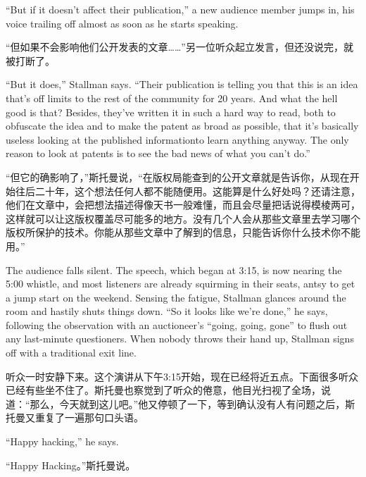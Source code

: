 \ifdefined\eng
``But if it doesn't affect their publication,'' a new audience member jumps in, his voice trailing off almost as soon as he starts speaking.
\fi

\ifdefined\chs
``但如果不会影响他们公开发表的文章……''另一位听众起立发言，但还没说完，就被打断了。
\fi

\ifdefined\eng
``But it does,'' Stallman says. ``Their publication is telling you that this is an idea that's off limits to the rest of the community for 20 years. And what the hell good is that? Besides, they've written it in such a hard way to read, both to obfuscate the idea and to make the patent as broad as possible, that it's basically useless looking at the published information\ifdefined{}\fi to learn anything anyway. The only reason to look at patents is to see the bad news of what you can't do.''
\fi

\ifdefined\chs
``但它的确影响了，''斯托曼说，``在版权局能查到的公开文章就是告诉你，从现在开始往后二十年，这个想法任何人都不能随便用。这能算是什么好处吗？还请注意，他们在文章中，会把想法描述得像天书一般难懂，而且会尽量把话说得模棱两可，这样就可以让这版权覆盖尽可能多的地方。没有几个人会从那些文章里去学习哪个版权所保护的技术。你能从那些文章中了解到的信息，只能告诉你什么技术你不能用。''
\fi

\ifdefined\eng
The audience falls silent. The speech, which began at 3:15, is now nearing the 5:00 whistle, and most listeners are already squirming in their seats, antsy to get a jump start on the weekend. Sensing the fatigue, Stallman glances around the room and hastily shuts things down. ``So it looks like we're done,'' he says, following the observation with an auctioneer's ``going, going, gone'' to flush out any last-minute questioners. When nobody throws their hand up, Stallman signs off with a traditional exit line.
\fi

\ifdefined\chs
听众一时安静下来。这个演讲从下午3:15开始，现在已经将近五点。下面很多听众已经有些坐不住了。斯托曼也察觉到了听众的倦意，他目光扫视了全场，说道：``那么，今天就到这儿吧。''他又停顿了一下，等到确认没有人有问题之后，斯托曼又重复了一遍那句口头语。
\fi

\ifdefined\eng
``Happy hacking,'' he says.
\fi

\ifdefined\chs
``Happy Hacking。''斯托曼说。
\fi

\theendnotes
\setcounter{endnote}{0}
